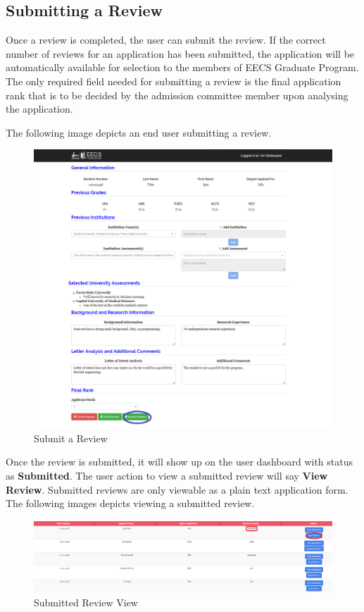 \documentclass[fontsize=12pt,paper=letter,twoside]{scrartcl}
\begin{document}
\subsection{Submitting a Review}
Once a review is completed, the user can submit the review. If the correct number of reviews for an application has been submitted, the application will be automatically available for selection to the members of EECS Graduate Program. The only required field needed for submitting a review is the final application rank that is to be decided by the admission committee member upon analysing the application.

\bigskip
\noindent The following image depicts an end user submitting a review. 

\begin{figure}[!htb]
\begin{center}
\includegraphics[width=.9\textwidth]{images/submit_review.png}
\end{center}
\caption{Submit a Review}
\label{fig:submit_review}
\end{figure}

\bigskip
\noindent Once the review is submitted, it will show up on the user dashboard with status as \textbf{Submitted}. The user action to view a submitted review will say \textbf{View Review}. Submitted reviews are only viewable as a plain text application form. The following images depicts viewing a submitted review.

\begin{figure}[!htb]
\begin{center}
\includegraphics[width=.9\textwidth]{images/submitted_review.png}
\end{center}
\caption{Submitted Review View}
\label{fig:submitted_review}
\end{figure}
\end{document}

